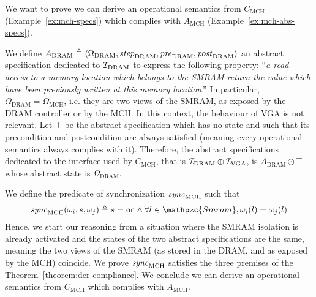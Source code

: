 \begin{example}
  We want to prove we can derive an operational semantics from $C_{\mathrm{MCH}}$
  (Example~\ref{ex:mch-specs}) which complies with $A_{\mathrm{MCH}}$
  (Example~\ref{ex:mch-abs-specs}).

  We define
  $A_{\mathrm{DRAM}} \triangleq \langle \Omega_{\mathrm{DRAM}}, \mathit{step}_{\mathrm{DRAM}},
  \mathit{pre}_{\mathrm{DRAM}}, \mathit{post}_{\mathrm{DRAM}} \rangle$ an abstract specification
  dedicated to $\mathcal{I}_{\mathrm{DRAM}}$ to express the following property: ``\emph{a
  read access to a memory location which belongs to the SMRAM return the value
  which have been previously written at this memory location}.'' In particular,
  $\Omega_{\mathrm{DRAM}} = \Omega_{\mathrm{MCH}}$, i.e. they are two views of
  the SMRAM, as exposed by the DRAM controller or by the MCH.
  In this context, the behaviour of VGA is not relevant. Let $\top$ be the
  abstract specification which has no state and such that its precondition and
  postcondition are always satisfied (meaning every operational semantics always
  complies with it).
  Therefore, the abstract specifications dedicated to the interface used by
  $C_{\mathrm{MCH}}$, that is $\mathcal{I}_{\mathrm{DRAM}} \oplus \mathcal{I}_{\mathrm{VGA}}$, is $A_{\mathrm{DRAM}} \odot \top$ whose
  abstract state is $\Omega_{\mathrm{DRAM}}$.

  We define the predicate of synchronization $\mathit{sync}_{\mathrm{MCH}}$ such that
  \[ \func{sync}_{\mathrm{MCH}}(\omega_i, s, \omega_j) \triangleq s = \val{on}
    \wedge \forall l \in \mathpzc{Smram}, \omega_i(l) = \omega_j(l)
  \] Hence, we start our reasoning from a situation where the SMRAM
  isolation is already activated and the states of the two abstract
  specifications are the same, meaning the two views of the SMRAM (as stored in
  the DRAM, and as exposed by the MCH) coincide.
  We prove $\mathit{sync}_{\mathrm{MCH}}$ satisfies the three premises of the
  Theorem~\ref{theorem:der-compliance}. We conclude we can derive
  an operational semantics from $C_{\mathrm{MCH}}$ which complies with $A_{\mathrm{MCH}}$.
\end{example}

